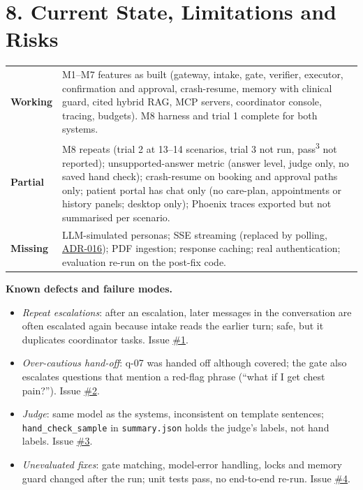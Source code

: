 \documentclass[10pt,a4paper]{article}
\newcommand{\repourl}{https://github.com/saideepaksana/careflow}
\newcommand{\rev}{cs5903-final-2026}
\newcommand{\adr}[1]{\href{\repourl/blob/\rev/docs/Architecture_Decision_Records.md}{ADR-#1}}
\newcommand{\issue}[1]{\href{\repourl/issues/#1}{\##1}}
\begin{document}
\section*{8. Current State, Limitations and Risks}

\begin{table}[H]
\centering
\footnotesize
\begin{tabularx}{\textwidth}{P{1.5cm} L}
\toprule
\textbf{Working} & M1--M7 features as built (gateway, intake, gate, verifier, executor, confirmation and approval, crash-resume, memory with clinical guard, cited hybrid RAG, MCP servers, coordinator console, tracing, budgets). M8 harness and trial 1 complete for both systems. \\
\textbf{Partial} & M8 repeats (trial 2 at 13--14 scenarios, trial 3 not run, pass\textsuperscript{3} not reported); unsupported-answer metric (answer level, judge only, no saved hand check); crash-resume on booking and approval paths only; patient portal has chat only (no care-plan, appointments or history panels; desktop only); Phoenix traces exported but not summarised per scenario. \\
\textbf{Missing} & LLM-simulated personas; SSE streaming (replaced by polling, \adr{016}); PDF ingestion; response caching; real authentication; evaluation re-run on the post-fix code. \\
\bottomrule
\end{tabularx}
\end{table}

\textbf{Known defects and failure modes.}
\begin{itemize}
    \item \emph{Repeat escalations}: after an escalation, later messages in the conversation are often escalated again because intake reads the earlier turn; safe, but it duplicates coordinator tasks. Issue \issue{1}.
    \item \emph{Over-cautious hand-off}: q-07 was handed off although covered; the gate also escalates questions that mention a red-flag phrase (``what if I get chest pain?''). Issue \issue{2}.
    \item \emph{Judge}: same model as the systems, inconsistent on template sentences; \texttt{hand\_check\_sample} in \texttt{summary.json} holds the judge's labels, not hand labels. Issue \issue{3}.
    \item \emph{Unevaluated fixes}: gate matching, model-error handling, locks and memory guard changed after the run; unit tests pass, no end-to-end re-run. Issue \issue{4}.
\end{itemize}
\end{document}
